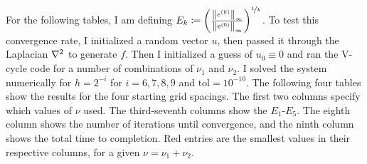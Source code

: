 \documentclass{article} %
\theoremstyle{plain}
\numberwithin{equation}{section} %
\numberwithin{figure}{section} %
\numberwithin{table}{section} %
\begin{document}
For the following tables, I am defining $E_k \coloneqq \qty(\frac{\norm{e^{(k)}}_\infty}{\norm{e^{(0)}}_\infty})^{\nicefrac{1}{k}}$.  To test this convergence rate, I initialized a random vector $u$, then passed it through the Laplacian $\laplacian$ to generate $f$.  Then I initialized a guess of $u_0 \equiv 0$ and ran the V-cycle code for a number of combinations of $\nu_1$ and $\nu_2$.  I solved the system numerically for $h = 2^{-i}$ for $i = 6,7,8,9$ and $\text{tol}=10^{-10}$.  The following four tables show the results for the four starting grid spacings.  The first two columns specify which values of $\nu$ used.  The third-seventh columns show the $E_1$-$E_5$.  The eighth column shows the number of iterations until convergence, and the ninth column shows the total time to completion.  Red entries are the smallest values in their respective columns, for a given $\nu=\nu_1+\nu_2$. \\
\end{document}
